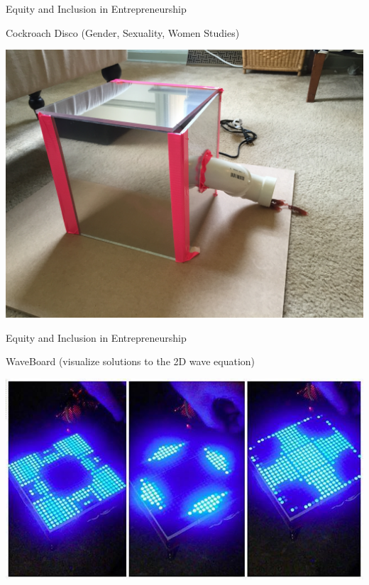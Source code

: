 \documentclass[xcolor=table,compress,professionalfonts,pdfpagelabels]{beamer}
\begin{document}
\begin{frame}{Equity and Inclusion in Entrepreneurship}
 \begin{block}{Cockroach Disco (Gender, Sexuality, Women Studies)}
 \begin{center}
  \includegraphics[height=0.75\textheight]{IMG_5941}
 \end{center}
 \end{block}
\end{frame}

\begin{frame}{Equity and Inclusion in Entrepreneurship}
 \begin{block}{WaveBoard (visualize solutions to the 2D wave equation)}
 \begin{center}
  \includegraphics[height=0.75\textheight]{14446150_710823349075039_7511569199451227995_n}
 \end{center}
 \end{block}
\end{frame}
\end{document}
